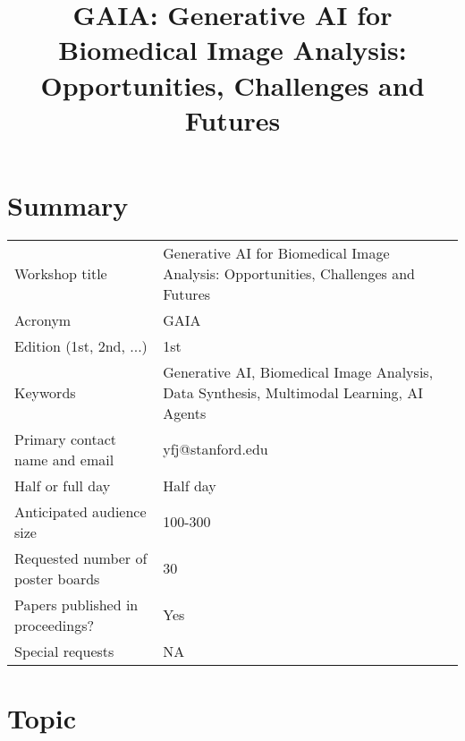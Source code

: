 \documentclass{article}
\title{GAIA: Generative AI for Biomedical Image Analysis: \\ Opportunities, Challenges and Futures}
\author{}
\date{}
\def\c#1{\textcolor{gray}{#1}}
\def\x{\textcolor{red}{xxx}}
\begin{document}
\maketitle



\section{Summary}
\small
\begin{tabular}{lp{9cm}}
  \hline
  Workshop title & Generative AI for Biomedical Image Analysis:  Opportunities, Challenges and Futures \\
  Acronym & GAIA \\
  Edition (1st, 2nd, ...) & 1st \\
  Keywords & Generative AI, Biomedical Image Analysis, Data Synthesis, Multimodal Learning, AI Agents\\
  Primary contact name and email & yfj@stanford.edu \\
  Half or full day & Half day \\
  Anticipated audience size & 100-300 \\
  Requested number of poster boards & 30 \\
  Papers published in proceedings? & Yes \\
  Special requests &  NA  \\
  \hline
\end{tabular}



\section{Topic}
\end{document}
